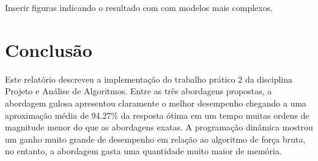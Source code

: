 \documentclass{article}
\begin{document}
Inserir figuras indicando o resultado com com modelos mais complexos.

\section{Conclusão}

Este relatório descreveu a implementação do trabalho prático 2 da disciplina Projeto e Análise de Algoritmos. Entre as três abordagens
propostas, a abordagem gulosa apresentou claramente o melhor desempenho chegando a uma aproximação média de 94.27\% da resposta ótima
em um tempo muitas ordens de magnitude menor do que as abordagens exatas. A programação dinâmica mostrou um ganho muito grande de desempenho 
em relação ao algoritmo de força bruta, no entanto, a abordagem gasta uma quantidade muito maior de memória.
\end{document}
